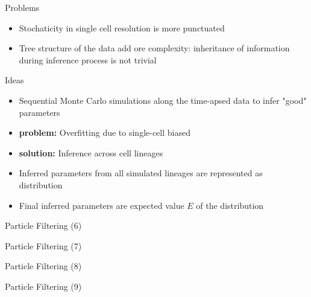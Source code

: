 \documentclass[pdf]
{beamer}
\begin{document}
\begin{frame}{Problems}
	\begin{itemize}
	\item Stochaticity in single cell resolution is more punctuated
	\item Tree structure of the data add ore complexity: inheritance of information during inference process is not trivial
	\end{itemize}
\end{frame}

\begin{frame}{Ideas}
	\begin{itemize}
	\item Sequential Monte Carlo simulations along the time-apsed data to infer "good" parameters
	\item<2-> \textbf{problem:} Overfitting due to single-cell biased
	\item<3-> \textbf{solution:} Inference across cell lineages
	\item<4-> Inferred parameters from all simulated lineages are represented as distribution
	\item<5-> Final inferred parameters are expected value $E$ of the distribution
	\end{itemize}
\end{frame}

\begin{frame}{Particle Filtering (6)}

\end{frame}

\begin{frame}{Particle Filtering (7)}

\end{frame}

\begin{frame}{Particle Filtering (8)}

\end{frame}

\begin{frame}{Particle Filtering (9)}

\end{frame}
\end{document}
